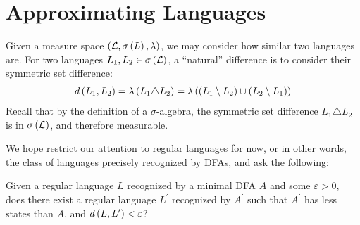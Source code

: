 \section{Approximating Languages}
Given a measure space
\(\left(\mathcal{L}, \sigma\left(L\right), \lambda\right)\),
we may consider how similar two languages are.
For two languages \(L_1, L_2 \in \sigma\left(\mathcal{L}\right)\),
a ``natural'' difference is to consider their
symmetric set difference:
\begin{align*}
  d\left(L_1, L_2\right)
    = \lambda\left(L_1 \triangle L_2\right)
    = \lambda\left(\left(L_1 \setminus L_2\right) \cup \left(L_2 \setminus L_1\right)\right)
\end{align*}
Recall that by the definition of a \(\sigma\)-algebra,
the symmetric set difference \(L_1 \triangle L_2\)
is in \(\sigma\left(\mathcal{L}\right)\), and therefore measurable.

We hope restrict our attention to regular languages for now,
or in other words, the class of languages precisely recognized by
DFAs, and ask the following:

\begin{question}
  Given a regular language \(L\) recognized by a minimal DFA \(A\)
  and some \(\varepsilon > 0\),
  does there exist a regular language \(L^\prime\) recognized by \(A^\prime\)
  such that \(A^\prime\) has less states than \(A\),
  and \(d\left(L, L^\prime\right) < \varepsilon\)?
\end{question}


